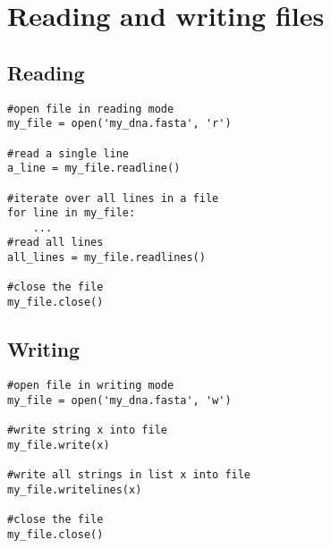 \documentclass[12pt]{article}
\begin{document}
\section*{Reading and writing files}
\begin{minipage}[t]{0.60\textwidth}

\subsection*{Reading}
\begin{verbatim}
#open file in reading mode
my_file = open('my_dna.fasta', 'r')

#read a single line
a_line = my_file.readline()

#iterate over all lines in a file
for line in my_file:
	...
#read all lines
all_lines = my_file.readlines()

#close the file
my_file.close()
\end{verbatim}
\end{minipage}
\begin{minipage}[t]{0.40\textwidth}
\subsection*{Writing}
\begin{verbatim}
#open file in writing mode
my_file = open('my_dna.fasta', 'w')

#write string x into file
my_file.write(x)

#write all strings in list x into file
my_file.writelines(x)

#close the file
my_file.close()
\end{verbatim}
\end{minipage}
\end{document}
